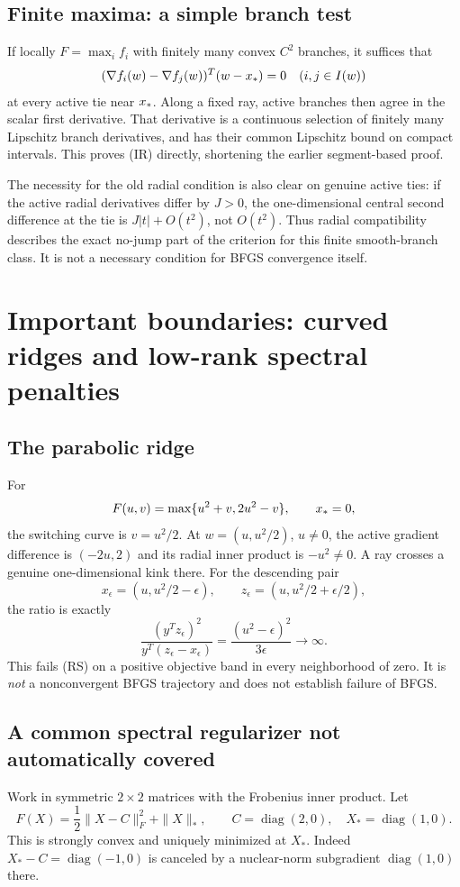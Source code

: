 \subsection{Finite maxima: a simple branch test}
If locally $F=\max_i f_i$ with finitely many convex $C^2$ branches, it suffices that
\[
 (\nabla f_i(w)-\nabla f_j(w))^T(w-x_*)=0
 \quad(i,j\in I(w))
\]
at every active tie near $x_*$. Along a fixed ray, active branches then agree in the scalar first derivative. That derivative is a continuous selection of finitely many Lipschitz branch derivatives, and has their common Lipschitz bound on compact intervals. This proves (IR) directly, shortening the earlier segment-based proof.

The necessity for the old radial condition is also clear on genuine active ties: if the active radial derivatives differ by $J>0$, the one-dimensional central second difference at the tie is $J|t|+O(t^2)$, not $O(t^2)$. Thus radial compatibility describes the exact no-jump part of the criterion for this finite smooth-branch class. It is not a necessary condition for BFGS convergence itself.


\setcounter{section}{6}
\setcounter{theorem}{0}
\setcounter{equation}{8}
\section{Important boundaries: curved ridges and low-rank spectral penalties}
\subsection{The parabolic ridge}
For
\[
 F(u,v)=\max\{u^2+v,2u^2-v\},\qquad x_*=0,
\]
the switching curve is $v=u^2/2$. At $w=(u,u^2/2)$, $u\ne0$, the active gradient difference is $(-2u,2)$ and its radial inner product is $-u^2\ne0$. A ray crosses a genuine one-dimensional kink there. For the descending pair
\[
 x_\epsilon=(u,u^2/2-\epsilon),\qquad
 z_\epsilon=(u,u^2/2+\epsilon/2),
\]
the ratio is exactly
\[
 \frac{(y^Tz_\epsilon)^2}{y^T(z_\epsilon-x_\epsilon)}
 =\frac{(u^2-\epsilon)^2}{3\epsilon}\to\infty.
\]
This fails (RS) on a positive objective band in every neighborhood of zero. It is \emph{not} a nonconvergent BFGS trajectory and does not establish failure of BFGS.

\subsection{A common spectral regularizer not automatically covered}
Work in symmetric $2\times2$ matrices with the Frobenius inner product. Let
\[
 F(X)=\frac12\|X-C\|_F^2+\|X\|_*,\qquad
 C=\operatorname{diag}(2,0),\quad X_*=\operatorname{diag}(1,0).
\]
This is strongly convex and uniquely minimized at $X_*$. Indeed $X_*-C=\operatorname{diag}(-1,0)$ is canceled by a nuclear-norm subgradient $\operatorname{diag}(1,0)$ there.

